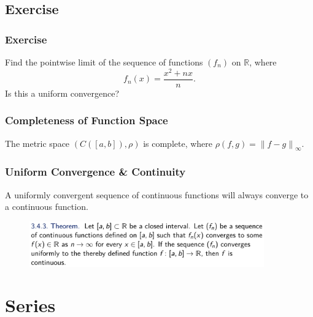 \documentclass[10pt, t]{beamer}
\newcommand{\R}{\mathbb{R}}
\begin{document}
\subsection{Exercise}
\begin{frame}
    \frametitle{Exercise}

    Find the pointwise limit of the sequence of functions $(f_n)$ on $\R$, where
    $$f_n(x)=\dfrac{x^2+nx}{n}.$$ Is this a uniform convergence?

\end{frame}

\begin{frame}
    \frametitle{Completeness of Function Space}

    The metric space $(C([a,b]),\rho)$ is complete, where $\rho(f,g)=\left\|f - g\right\|_\infty$. 

\end{frame}


\begin{frame}
    \frametitle{Uniform Convergence \& Continuity}

    A uniformly convergent sequence of continuous functions will always converge to a continuous function.

    \begin{figure}[H]
        \centering
        \includegraphics[width=0.9\textwidth]{2020-11-11-12-54-55.png}
    \end{figure}
    
\end{frame}

\section{Series}
\end{document}
